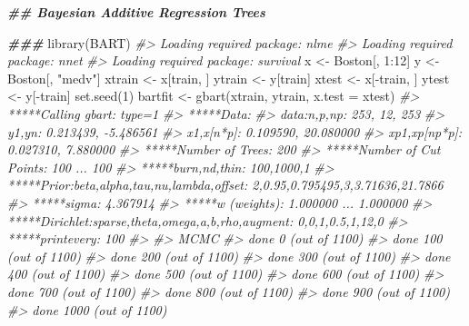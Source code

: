 \documentclass[
]{book}
\newenvironment{Shaded}{\begin{snugshade}}{\end{snugshade}}
\newcommand{\AttributeTok}[1]{\textcolor[rgb]{0.77,0.63,0.00}{#1}}
\newcommand{\CommentTok}[1]{\textcolor[rgb]{0.56,0.35,0.01}{\textit{#1}}}
\newcommand{\DecValTok}[1]{\textcolor[rgb]{0.00,0.00,0.81}{#1}}
\newcommand{\DocumentationTok}[1]{\textcolor[rgb]{0.56,0.35,0.01}{\textbf{\textit{#1}}}}
\newcommand{\FunctionTok}[1]{\textcolor[rgb]{0.00,0.00,0.00}{#1}}
\newcommand{\NormalTok}[1]{#1}
\newcommand{\OtherTok}[1]{\textcolor[rgb]{0.56,0.35,0.01}{#1}}
\newcommand{\SpecialCharTok}[1]{\textcolor[rgb]{0.00,0.00,0.00}{#1}}
\newcommand{\StringTok}[1]{\textcolor[rgb]{0.31,0.60,0.02}{#1}}
\begin{document}
\begin{Shaded}
\begin{Highlighting}[]
\DocumentationTok{\#\# Bayesian Additive Regression Trees}

\DocumentationTok{\#\#\#}
\FunctionTok{library}\NormalTok{(BART)}
\CommentTok{\#\textgreater{} Loading required package: nlme}
\CommentTok{\#\textgreater{} Loading required package: nnet}
\CommentTok{\#\textgreater{} Loading required package: survival}
\NormalTok{x }\OtherTok{\textless{}{-}}\NormalTok{ Boston[, }\DecValTok{1}\SpecialCharTok{:}\DecValTok{12}\NormalTok{]}
\NormalTok{y }\OtherTok{\textless{}{-}}\NormalTok{ Boston[, }\StringTok{"medv"}\NormalTok{]}
\NormalTok{xtrain }\OtherTok{\textless{}{-}}\NormalTok{ x[train, ]}
\NormalTok{ytrain }\OtherTok{\textless{}{-}}\NormalTok{ y[train]}
\NormalTok{xtest }\OtherTok{\textless{}{-}}\NormalTok{ x[}\SpecialCharTok{{-}}\NormalTok{train, ]}
\NormalTok{ytest }\OtherTok{\textless{}{-}}\NormalTok{ y[}\SpecialCharTok{{-}}\NormalTok{train]}
\FunctionTok{set.seed}\NormalTok{(}\DecValTok{1}\NormalTok{)}
\NormalTok{bartfit }\OtherTok{\textless{}{-}} \FunctionTok{gbart}\NormalTok{(xtrain, ytrain, }\AttributeTok{x.test =}\NormalTok{ xtest)}
\CommentTok{\#\textgreater{} *****Calling gbart: type=1}
\CommentTok{\#\textgreater{} *****Data:}
\CommentTok{\#\textgreater{} data:n,p,np: 253, 12, 253}
\CommentTok{\#\textgreater{} y1,yn: 0.213439, {-}5.486561}
\CommentTok{\#\textgreater{} x1,x[n*p]: 0.109590, 20.080000}
\CommentTok{\#\textgreater{} xp1,xp[np*p]: 0.027310, 7.880000}
\CommentTok{\#\textgreater{} *****Number of Trees: 200}
\CommentTok{\#\textgreater{} *****Number of Cut Points: 100 ... 100}
\CommentTok{\#\textgreater{} *****burn,nd,thin: 100,1000,1}
\CommentTok{\#\textgreater{} *****Prior:beta,alpha,tau,nu,lambda,offset: 2,0.95,0.795495,3,3.71636,21.7866}
\CommentTok{\#\textgreater{} *****sigma: 4.367914}
\CommentTok{\#\textgreater{} *****w (weights): 1.000000 ... 1.000000}
\CommentTok{\#\textgreater{} *****Dirichlet:sparse,theta,omega,a,b,rho,augment: 0,0,1,0.5,1,12,0}
\CommentTok{\#\textgreater{} *****printevery: 100}
\CommentTok{\#\textgreater{} }
\CommentTok{\#\textgreater{} MCMC}
\CommentTok{\#\textgreater{} done 0 (out of 1100)}
\CommentTok{\#\textgreater{} done 100 (out of 1100)}
\CommentTok{\#\textgreater{} done 200 (out of 1100)}
\CommentTok{\#\textgreater{} done 300 (out of 1100)}
\CommentTok{\#\textgreater{} done 400 (out of 1100)}
\CommentTok{\#\textgreater{} done 500 (out of 1100)}
\CommentTok{\#\textgreater{} done 600 (out of 1100)}
\CommentTok{\#\textgreater{} done 700 (out of 1100)}
\CommentTok{\#\textgreater{} done 800 (out of 1100)}
\CommentTok{\#\textgreater{} done 900 (out of 1100)}
\CommentTok{\#\textgreater{} done 1000 (out of 1100)}

\end{Highlighting}
\end{Shaded}
\end{document}
